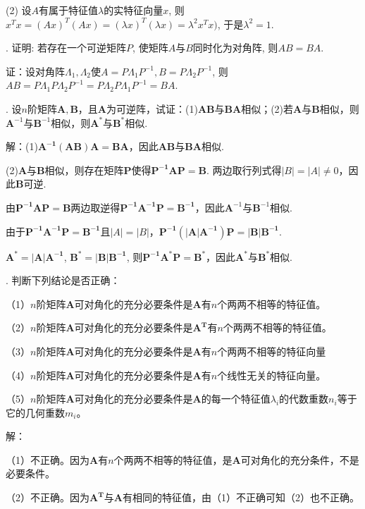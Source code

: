 \documentclass[10pt,twocolumn,letterpaper]{article}
\theoremstyle{mythmstyle}
\begin{document}
\noindent (2) 设$A$有属于特征值$\lambda$的实特征向量$x$, 则$x^T x=(Ax)^T (Ax)=(\lambda x)^T (\lambda x)=\lambda^2 x^T x)$, 于是$\lambda^2=1$.

\vspace{1em}
. 证明: 若存在一个可逆矩阵$P$, 使矩阵$A$与$B$同时化为对角阵, 则$AB=BA$.

\noindent 证：设对角阵$\Lambda_1, \Lambda_2$使$A=P\Lambda_1 P^{-1}, B=P\Lambda_2 P^{-1}$, 则$AB=P\Lambda_1 P\Lambda_2 P^{-1}=P\Lambda_2 P\Lambda_1 P^{-1}=BA$.

\vspace{1em}
. 设$n$阶矩阵$\bm{A},\bm{B}$，且$\bm{A}$为可逆阵，试证：(1)$\bm{AB}$与$\bm{BA}$相似；(2)若$\bm{A}$与$\bm{B}$相似，则$\bm{A}^{-1}$与$\bm{B}^{-1}$相似，则$\bm{A}^*$与$\bm{B}^*$相似.

\noindent 解：(1)$\bm{A^{-1}(AB)A} = \bm{BA}$，因此$\bm{AB}$与$\bm{BA}$相似.

(2)$\bm{A}$与$\bm{B}$相似，则存在矩阵$\bm{P}$使得$\bm{P^{-1}AP} = \bm{B}$. 两边取行列式得$|B| = |A| \neq 0$，因此$\bm{B}$可逆.

由$\bm{P^{-1}AP} = \bm{B}$两边取逆得$\bm{P^{-1}A^{-1}P} = \bm{B^{-1}}$，因此$\bm{A}^{-1}$与$\bm{B}^{-1}$相似.

由于$\bm{P^{-1}A^{-1}P} = \bm{B^{-1}}$且$|A| = |B|$，$\bm{P^{-1}(|A|A^{-1})P} = \bm{|B|B^{-1}}$.

$\bm{A^*} = \bm{|A|A^{-1}}$, $\bm{B^*} = \bm{|B|B^{-1}}$, 则$\bm{P^{-1}A^*P} = \bm{B^*}$，因此$\bm{A}^*$与$\bm{B}^*$相似.

\vspace{1em}
. 判断下列结论是否正确：

（1）$n$阶矩阵$\bm{A}$可对角化的充分必要条件是$\bm{A}$有$n$个两两不相等的特征值。

（2）$n$阶矩阵$\bm{A}$可对角化的充分必要条件是$\bm{A^T}$有$n$个两两不相等的特征值。

（3）$n$阶矩阵$\bm{A}$可对角化的充分必要条件是$\bm{A}$有$n$个两两不相等的特征向量

（4）$n$阶矩阵$\bm{A}$可对角化的充分必要条件是$\bm{A}$有$n$个线性无关的特征向量。

（5）$n$阶矩阵$\bm{A}$可对角化的充分必要条件是$\bm{A}$的每一个特征值$\lambda_i$的代数重数$n_i$等于它的几何重数$m_i$。

\noindent 解：

（1）不正确。因为$\bm{A}$有$n$个两两不相等的特征值，是$\bm{A}$可对角化的充分条件，不是必要条件。

（2）不正确。因为$\bm{A^T}$与$\bm{A}$有相同的特征值，由（1）不正确可知（2）也不正确。
\end{document}
